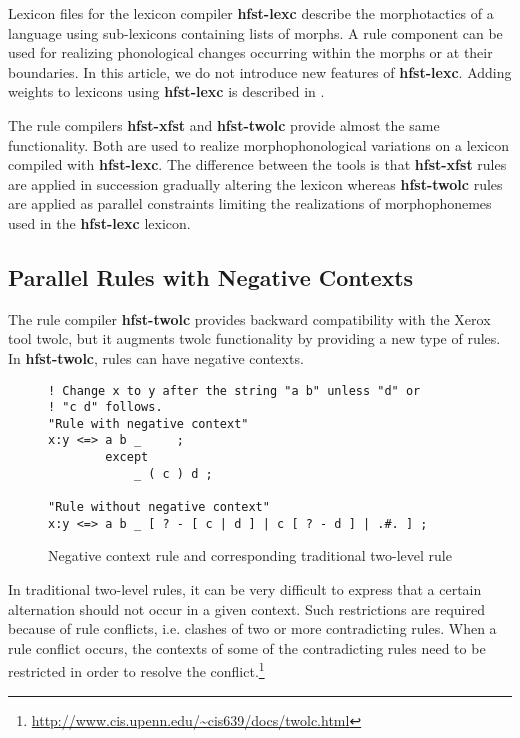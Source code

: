 \documentclass[draft]{llncs}
\begin{document}
Lexicon files for the lexicon compiler \textbf{hfst-lexc} describe the morphotactics of a
language using sub-lexicons containing lists of morphs. A rule
component can be used for realizing phonological changes occurring 
within the morphs or at their boundaries. In this article, we do not introduce new features 
of \textbf{hfst-lexc}. Adding weights to lexicons using \textbf{hfst-lexc} is described in \cite{linden/2009/fsmnlp}.

The rule compilers \textbf{hfst-xfst} and \textbf{hfst-twolc} provide almost the same
functionality. Both are used to realize morphophonological variations
on a lexicon compiled with \textbf{hfst-lexc}. The difference between the tools is that
\textbf{hfst-xfst} rules are applied in succession gradually altering the
lexicon whereas \textbf{hfst-twolc} rules are applied as parallel constraints limiting
the realizations of morphophonemes used in the \textbf{hfst-lexc} lexicon.

\subsection{Parallel Rules with Negative Contexts}

The rule compiler \textbf{hfst-twolc} provides backward compatibility with the
Xerox tool twolc, but it augments twolc functionality by providing a new type of rules. 
In \textbf{hfst-twolc}, rules can have negative contexts.
\begin{figure}
{\footnotesize
\begin{verbatim}
! Change x to y after the string "a b" unless "d" or 
! "c d" follows.
"Rule with negative context"
x:y <=> a b _     ;
        except
            _ ( c ) d ;

"Rule without negative context"
x:y <=> a b _ [ ? - [ c | d ] | c [ ? - d ] | .#. ] ;
\end{verbatim}
}
\caption{Negative context rule and corresponding traditional two-level
  rule}\label{negative-context-rule}
\end{figure}

In traditional two-level rules, it can be very difficult to express
that a certain alternation should not occur in a given context. Such
restrictions are required because of rule conflicts, i.e. clashes of
two or more contradicting rules. When a rule conflict occurs, the
contexts of some of the contradicting rules need to be restricted in
order to resolve the
conflict.\footnote{\url{http://www.cis.upenn.edu/~cis639/docs/twolc.html}}
\end{document}
